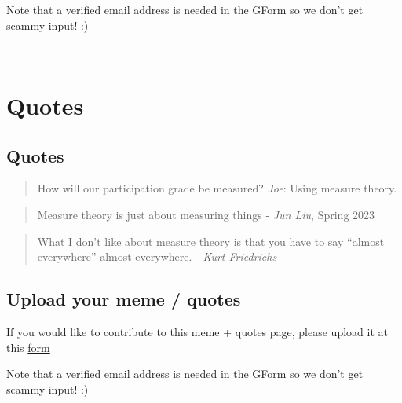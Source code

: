 \documentclass[
  letterpaper,
  DIV=11,
  numbers=noendperiod]{scrreprt}
\theoremstyle{definition}
\theoremstyle{plain}
\theoremstyle{remark}
\begin{document}
Note that a verified email address is needed in the GForm so we don't
get scammy input! :)

\(\,\)


\hypertarget{quotes}{%
\chapter*{Quotes}\label{quotes}}


\hypertarget{quotes-1}{%
\section*{Quotes}\label{quotes-1}}


\begin{quote}
How will our participation grade be measured? \emph{Joe}: Using measure
theory.
\end{quote}

\begin{quote}
Measure theory is just about measuring things - \emph{Jun Liu}, Spring
2023
\end{quote}

\begin{quote}
What I don't like about measure theory is that you have to say ``almost
everywhere'' almost everywhere. - \emph{Kurt Friedrichs}
\end{quote}

\hypertarget{upload-your-meme-quotes}{%
\section*{Upload your meme / quotes}\label{upload-your-meme-quotes}}


If you would like to contribute to this meme + quotes page, please
upload it at this \href{https://forms.gle/RBmMNYJp4u3qD5W79}{form}

Note that a verified email address is needed in the GForm so we don't
get scammy input! :)

\(\,\)
\end{document}
